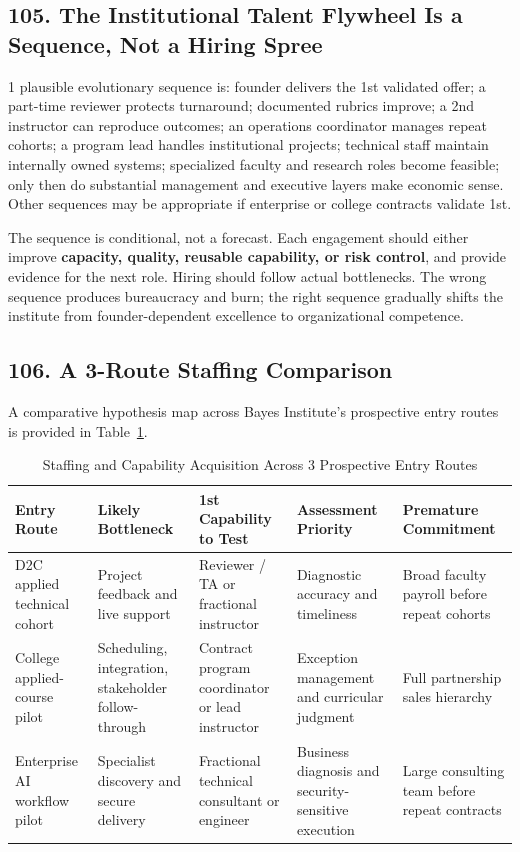 \subsection*{105. The Institutional Talent Flywheel Is a Sequence, Not a Hiring Spree}

1 plausible evolutionary sequence is: founder delivers the 1st validated offer; a part-time reviewer protects turnaround; documented rubrics improve; a 2nd instructor can reproduce outcomes; an operations coordinator manages repeat cohorts; a program lead handles institutional projects; technical staff maintain internally owned systems; specialized faculty and research roles become feasible; only then do substantial management and executive layers make economic sense. Other sequences may be appropriate if enterprise or college contracts validate 1st.

The sequence is conditional, not a forecast. Each engagement should either improve \textbf{capacity, quality, reusable capability, or risk control}, and provide evidence for the next role. Hiring should follow actual bottlenecks. The wrong sequence produces bureaucracy and burn; the right sequence gradually shifts the institute from founder-dependent excellence to organizational competence.

\subsection*{106. A 3-Route Staffing Comparison}

A comparative hypothesis map across Bayes Institute's prospective entry routes is provided in Table~\ref{tab:three_route_staffing}.

\begin{table}[t]
\centering
\small
\caption{Staffing and Capability Acquisition Across 3 Prospective Entry Routes}
\label{tab:three_route_staffing}
\begin{tabularx}{\textwidth}{p{3.2cm} p{3.2cm} p{3.2cm} p{3.2cm} X}
\toprule
\textbf{Entry Route} & \textbf{Likely Bottleneck} & \textbf{1st Capability to Test} & \textbf{Assessment Priority} & \textbf{Premature Commitment} \\
\midrule
D2C applied technical cohort & Project feedback and live support & Reviewer / TA or fractional instructor & Diagnostic accuracy and timeliness & Broad faculty payroll before repeat cohorts \\
College applied-course pilot & Scheduling, integration, stakeholder follow-through & Contract program coordinator or lead instructor & Exception management and curricular judgment & Full partnership sales hierarchy \\
Enterprise AI workflow pilot & Specialist discovery and secure delivery & Fractional technical consultant or engineer & Business diagnosis and security-sensitive execution & Large consulting team before repeat contracts \\
\bottomrule
\end{tabularx}
\end{table}

